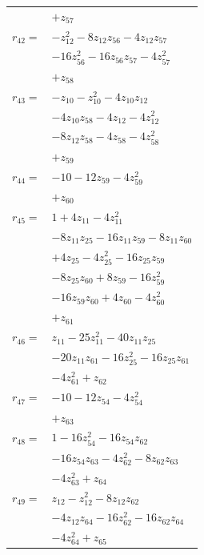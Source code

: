 \begin{longtable}{@{}r@{\;}l@{}}
 & \(\displaystyle +z_{57}\) \\[3pt]
\(r_{42}=\) & \(\displaystyle -z_{12}^{2} -8z_{12}z_{56} -4z_{12}z_{57}\) \\
 & \(\displaystyle -16z_{56}^{2} -16z_{56}z_{57} -4z_{57}^{2}\) \\
 & \(\displaystyle +z_{58}\) \\[3pt]
\(r_{43}=\) & \(\displaystyle -z_{10} -z_{10}^{2} -4z_{10}z_{12}\) \\
 & \(\displaystyle -4z_{10}z_{58} -4z_{12} -4z_{12}^{2}\) \\
 & \(\displaystyle -8z_{12}z_{58} -4z_{58} -4z_{58}^{2}\) \\
 & \(\displaystyle +z_{59}\) \\[3pt]
\(r_{44}=\) & \(\displaystyle -10 -12z_{59} -4z_{59}^{2}\) \\
 & \(\displaystyle +z_{60}\) \\[3pt]
\(r_{45}=\) & \(\displaystyle 1 +4z_{11} -4z_{11}^{2}\) \\
 & \(\displaystyle -8z_{11}z_{25} -16z_{11}z_{59} -8z_{11}z_{60}\) \\
 & \(\displaystyle +4z_{25} -4z_{25}^{2} -16z_{25}z_{59}\) \\
 & \(\displaystyle -8z_{25}z_{60} +8z_{59} -16z_{59}^{2}\) \\
 & \(\displaystyle -16z_{59}z_{60} +4z_{60} -4z_{60}^{2}\) \\
 & \(\displaystyle +z_{61}\) \\[3pt]
\(r_{46}=\) & \(\displaystyle z_{11} -25z_{11}^{2} -40z_{11}z_{25}\) \\
 & \(\displaystyle -20z_{11}z_{61} -16z_{25}^{2} -16z_{25}z_{61}\) \\
 & \(\displaystyle -4z_{61}^{2} +z_{62}\) \\[3pt]
\(r_{47}=\) & \(\displaystyle -10 -12z_{54} -4z_{54}^{2}\) \\
 & \(\displaystyle +z_{63}\) \\[3pt]
\(r_{48}=\) & \(\displaystyle 1 -16z_{54}^{2} -16z_{54}z_{62}\) \\
 & \(\displaystyle -16z_{54}z_{63} -4z_{62}^{2} -8z_{62}z_{63}\) \\
 & \(\displaystyle -4z_{63}^{2} +z_{64}\) \\[3pt]
\(r_{49}=\) & \(\displaystyle z_{12} -z_{12}^{2} -8z_{12}z_{62}\) \\
 & \(\displaystyle -4z_{12}z_{64} -16z_{62}^{2} -16z_{62}z_{64}\) \\
 & \(\displaystyle -4z_{64}^{2} +z_{65}\) \\[3pt]

\end{longtable}
